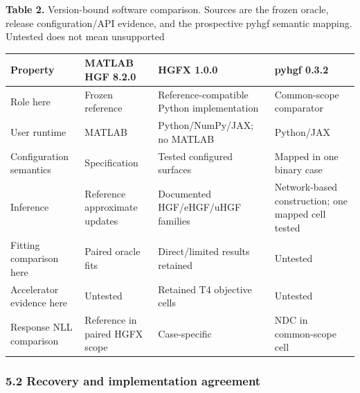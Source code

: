\documentclass[
  11pt,
]{article}
\newcounter{none} %
\begin{document}
\begin{minipage}{\linewidth}
\textbf{Table 2.} Version-bound software comparison. Sources are the
frozen oracle, release configuration/API evidence, and the prospective
pyhgf semantic mapping. Untested does not mean unsupported

{\def\LTcaptype{none} %
\begin{tabular}{@{}
  >{\raggedright\arraybackslash}p{}
  >{\raggedright\arraybackslash}p{}
  >{\raggedright\arraybackslash}p{}
  >{\raggedright\arraybackslash}p{}@{}}
\toprule\noalign{}
\begin{minipage}[b]{\linewidth}\raggedright
Property
\end{minipage} & \begin{minipage}[b]{\linewidth}\raggedright
MATLAB HGF 8.2.0
\end{minipage} & \begin{minipage}[b]{\linewidth}\raggedright
HGFX 1.0.0
\end{minipage} & \begin{minipage}[b]{\linewidth}\raggedright
pyhgf 0.3.2
\end{minipage} \\
\midrule\noalign{}


Role here & Frozen reference & Reference-compatible Python
implementation & Common-scope comparator \\
User runtime & MATLAB & Python/NumPy/JAX; no MATLAB & Python/JAX \\
Configuration semantics & Specification & Tested configured surfaces &
Mapped in one binary case \\
Inference & Reference approximate updates & Documented HGF/eHGF/uHGF
families & Network-based construction; one mapped cell tested \\
Fitting comparison here & Paired oracle fits & Direct/limited results
retained & Untested \\
Accelerator evidence here & Untested & Retained T4 objective cells &
Untested \\
Response NLL comparison & Reference in paired HGFX scope & Case-specific
& NDC in common-scope cell \\
\bottomrule
\end{tabular}
}
\end{minipage}


\subsubsection{5.2 Recovery and implementation
agreement}\label{recovery-and-implementation-agreement}
\end{document}
